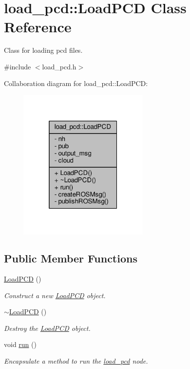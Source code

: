 \hypertarget{classload__pcd_1_1_load_p_c_d}{}\section{load\+\_\+pcd\+:\+:Load\+P\+CD Class Reference}
\label{classload__pcd_1_1_load_p_c_d}


Class for loading pcd files.  




{\ttfamily \#include $<$load\+\_\+pcd.\+h$>$}



Collaboration diagram for load\+\_\+pcd\+:\+:Load\+P\+CD\+:\nopagebreak
\begin{figure}[H]
\begin{center}
\leavevmode
\includegraphics[width=184pt]{classload__pcd_1_1_load_p_c_d__coll__graph}
\end{center}
\end{figure}
\subsection*{Public Member Functions}
\begin{DoxyCompactItemize}
\item 
\hyperlink{classload__pcd_1_1_load_p_c_d_a3fd11130cec167f69b6061009dc84748}{Load\+P\+CD} ()
\begin{DoxyCompactList}\small\item\em Construct a new \hyperlink{classload__pcd_1_1_load_p_c_d}{Load\+P\+CD} object. \end{DoxyCompactList}\item 
\hyperlink{classload__pcd_1_1_load_p_c_d_a48acb121f4dd61dcc3f7da12a300b8ba}{$\sim$\+Load\+P\+CD} ()
\begin{DoxyCompactList}\small\item\em Destroy the \hyperlink{classload__pcd_1_1_load_p_c_d}{Load\+P\+CD} object. \end{DoxyCompactList}\item 
void \hyperlink{classload__pcd_1_1_load_p_c_d_a724e71f567347d242039611c423db5c8}{run} ()
\begin{DoxyCompactList}\small\item\em Encapsulate a method to run the \hyperlink{namespaceload__pcd}{load\+\_\+pcd} node. \end{DoxyCompactList}\end{DoxyCompactItemize}
